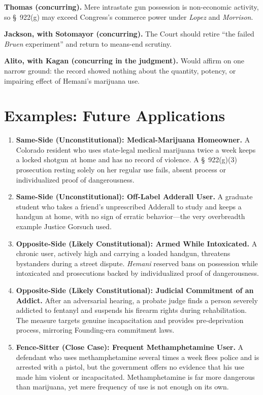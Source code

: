 \documentclass[12pt]{article}
\begin{document}
\textbf{Thomas (concurring).} Mere intrastate gun possession is non-economic activity, so \S~922(g) may exceed Congress's commerce power under \textit{Lopez} and \textit{Morrison}.

\textbf{Jackson, with Sotomayor (concurring).} The Court should retire ``the failed \textit{Bruen} experiment'' and return to means-end scrutiny.

\textbf{Alito, with Kagan (concurring in the judgment).} Would affirm on one narrow ground: the record showed nothing about the quantity, potency, or impairing effect of Hemani's marijuana use.

\section{Examples: Future Applications}

\begin{enumerate}
\item \textbf{Same-Side (Unconstitutional): Medical-Marijuana Homeowner.} A Colorado resident who uses state-legal medical marijuana twice a week keeps a locked shotgun at home and has no record of violence. A \S~922(g)(3) prosecution resting solely on her regular use fails, absent process or individualized proof of dangerousness.
\item \textbf{Same-Side (Unconstitutional): Off-Label Adderall User.} A graduate student who takes a friend's unprescribed Adderall to study and keeps a handgun at home, with no sign of erratic behavior---the very overbreadth example Justice Gorsuch used.
\item \textbf{Opposite-Side (Likely Constitutional): Armed While Intoxicated.} A chronic user, actively high and carrying a loaded handgun, threatens bystanders during a street dispute. \textit{Hemani} reserved bans on possession while intoxicated and prosecutions backed by individualized proof of dangerousness.
\item \textbf{Opposite-Side (Likely Constitutional): Judicial Commitment of an Addict.} After an adversarial hearing, a probate judge finds a person severely addicted to fentanyl and suspends his firearm rights during rehabilitation. The measure targets genuine incapacitation and provides pre-deprivation process, mirroring Founding-era commitment laws.
\item \textbf{Fence-Sitter (Close Case): Frequent Methamphetamine User.} A defendant who uses methamphetamine several times a week flees police and is arrested with a pistol, but the government offers no evidence that his use made him violent or incapacitated. Methamphetamine is far more dangerous than marijuana, yet mere frequency of use is not enough on its own.
\end{enumerate}
\end{document}
